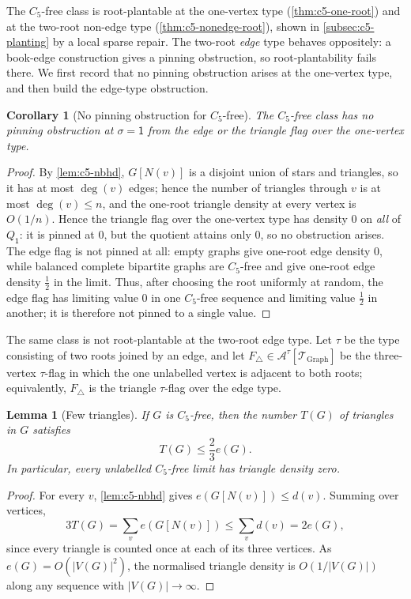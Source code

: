 \documentclass[11pt]{article}
\newtheorem{lemma}[lemma]{Lemma}
\newtheorem{corollary}[corollary]{Corollary}
\theoremstyle{definition}
\newcommand{\A}{\mathcal{A}}
\newcommand{\T}{\mathcal{T}}
\newcommand{\vtype}{\mathsf{1}}
\begin{document}
The $C_5$-free class is root-plantable at the one-vertex type (\cref{thm:c5-one-root}) and at the
two-root non-edge type (\cref{thm:c5-nonedge-root}), shown in \cref{subsec:c5-planting} by a local
sparse repair.  The two-root \emph{edge} type behaves oppositely: a book-edge construction gives a
pinning obstruction, so root-plantability fails there.  We first record that no pinning obstruction
arises at the one-vertex type, and then build the edge-type obstruction.

\begin{corollary}[No pinning obstruction for $C_5$-free]\label{cor:c5-no-pin}
The $C_5$-free class has no pinning obstruction at $\sigma=\vtype$ from the edge or the
triangle flag over the one-vertex type.
\end{corollary}

\begin{proof}
By \cref{lem:c5-nbhd}, $G[N(v)]$ is a disjoint union of stars and triangles, so it has
at most $\deg(v)$ edges; hence the number of triangles through $v$ is at most $\deg(v)\le n$,
and the one-root triangle density at every vertex is $O(1/n)$.  Hence the
triangle flag over the one-vertex type has density $0$ on \emph{all} of $Q_{\vtype}$: it is pinned at $0$, but
the quotient attains only $0$, so no obstruction arises.  The edge flag is not
pinned at all: empty graphs give one-root edge density $0$, while balanced complete
bipartite graphs are $C_5$-free and give one-root edge density $\tfrac12$ in the limit.
Thus, after choosing the root uniformly at random, the edge flag has limiting value $0$ in
one $C_5$-free sequence and limiting value $\tfrac12$ in another; it is therefore not
pinned to a single value.
\end{proof}

The same class is not root-plantable at the two-root edge type.  Let $\tau$ be
the type consisting of two roots joined by an edge, and let
$F_\triangle\in\A^\tau[\T_{\mathrm{Graph}}]$ be the three-vertex $\tau$-flag in which
the one unlabelled vertex is adjacent to both roots; equivalently, $F_\triangle$ is the
triangle $\tau$-flag over the edge type.

\begin{lemma}[Few triangles]\label{lem:c5-few-triangles}
If $G$ is $C_5$-free, then the number $T(G)$ of triangles in $G$ satisfies
\[
  T(G)\le\frac23 e(G).
\]
In particular, every unlabelled $C_5$-free limit has triangle density zero.
\end{lemma}

\begin{proof}
For every $v$, \cref{lem:c5-nbhd} gives $e(G[N(v)])\le d(v)$.  Summing over
vertices,
\[
  3T(G)=\sum_v e(G[N(v)])\le \sum_v d(v)=2e(G),
\]
since every triangle is counted once at each of its three vertices.  As
$e(G)=O(|V(G)|^2)$, the normalised triangle density is $O(1/|V(G)|)$ along any
sequence with $|V(G)|\to\infty$.
\end{proof}
\end{document}
